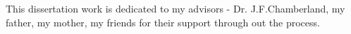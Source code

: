 \TAMUDedicationFormat
\begin{center}
\vspace*{\fill}
This dissertation work is dedicated to my advisors - Dr. J.F.Chamberland, my father, my mother, my friends for their support through out the process.
\vspace*{\fill}
\end{center}


